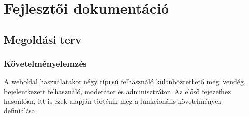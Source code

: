 \chapter{Fejlesztői dokumentáció}
\label{ch:impl}

\section{Megoldási terv}

\subsection{Követelményelemzés}

A weboldal használatakor négy típusú felhasználó különböztethető meg: vendég, bejelentkezett felhasználó, moderátor és adminisztrátor. Az előző fejezethez hasonlóan, itt is ezek alapján történik meg a funkcionális követelmények definiálása.

